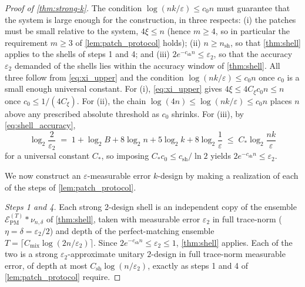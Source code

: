 \documentclass[
    aps,
    superscriptaddress,
    onecolumn,
    10pt,
    prx,
    nofootinbib
]{revtex4-2}
\theoremstyle{namedstatement}
\theoremstyle{plain}
\begin{document}
\begin{proof}[Proof of \cref{thm:strong-k}]
The condition $\log(nk/\varepsilon)\leq c_{0}n$ must guarantee that the system is large
enough for the construction, in three respects: (i) the patches must be small relative
to the system, $4\xi\leq n$ (hence $m\geq 4$, so in particular the requirement
$m \geq 3$ of \cref{lem:patch_protocol} holds); (ii) $n\geq n_{\mathrm{sh}}$, so that
\cref{thm:shell} applies to the shells of steps 1 and 4; and (iii)
$2e^{-c_{\mathrm{sh}}n}\leq \varepsilon_2$, so that the accuracy $\varepsilon_2$
demanded of the shells lies within the accuracy window of \cref{thm:shell}. All three
follow from \cref{eq:xi_upper} and the condition $\log(nk/\varepsilon)\leq c_0 n$ once
$c_{0}$ is a small enough universal constant. For (i), \cref{eq:xi_upper} gives
$4\xi\leq 4C_{\xi}c_{0}n\leq n$ once $c_{0}\leq 1/(4C_{\xi})$. For (ii), the chain
$\log(4n)\leq\log(nk/\varepsilon)\leq c_{0}n$ places $n$ above any prescribed absolute
threshold as $c_{0}$ shrinks. For (iii), by \cref{eq:shell_accuracy},
\begin{equation}
    \log_{2}\frac{2}{\varepsilon_2}
    \;=\; 1 + \log_{2}B + 8\log_{2}n + 5\log_{2}k + 8\log_{2}\frac{1}{\varepsilon}
    \;\leq\; C_{*}\log_{2}\frac{nk}{\varepsilon}
\end{equation}
for a universal constant $C_{*}$, so imposing $C_{*}c_{0}\leq c_{\mathrm{sh}}/\ln 2$
yields $2e^{-c_{\mathrm{sh}}n}\leq\varepsilon_2$.

We now construct an $\varepsilon$-measurable error $k$-design by making a realization
of each of the steps of \cref{lem:patch_protocol}.

\emph{Steps 1 and 4.} Each strong 2-design shell is an independent copy of the ensemble
$\mathcal{E}^{(T)}_{\mathrm{PM}}*\nu_{n,\delta}$ of \cref{thm:shell}, taken with
measurable error $\varepsilon_2$ in full trace-norm ($\eta=\delta=\varepsilon_2/2$) and
depth of the perfect-matching ensemble
$T=\lceil C_{\mathrm{mix}}\log(2n/\varepsilon_2)\rceil$. Since
$2e^{-c_{\mathrm{sh}}n}\leq \varepsilon_2\leq 1$, \cref{thm:shell} applies. Each of the
two is a strong $\varepsilon_2$-approximate unitary $2$-design in full trace-norm
measurable error, of depth at most $C_{\mathrm{sh}}\log(n/\varepsilon_2)$, exactly as
steps 1 and 4 of \cref{lem:patch_protocol} require.


\end{proof}
\end{document}
